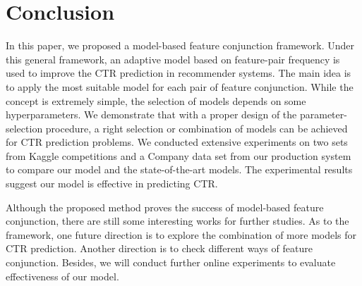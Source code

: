 \section{Conclusion}
In this paper, we proposed a model-based feature conjunction framework. Under this general framework, an adaptive model based on feature-pair frequency is used to improve the CTR prediction in recommender systems. The main idea is to apply the most suitable model for each pair of feature conjunction. While the concept is extremely simple, the selection of models depends on some hyperparameters. We demonstrate that with a proper design of the parameter-selection procedure, a right selection or combination of models can be achieved for CTR prediction problems. We conducted extensive experiments on two sets from Kaggle competitions and a Company data set from our production system to compare our model and the state-of-the-art models. The experimental results suggest our model is effective in predicting CTR.

Although the proposed method proves the success of model-based feature conjunction, there are still some interesting works for further studies. As to the framework, one future direction is to explore the combination of more models for CTR prediction. Another direction is to check different ways of feature conjunction. Besides, we will conduct further online experiments to evaluate effectiveness of our model.